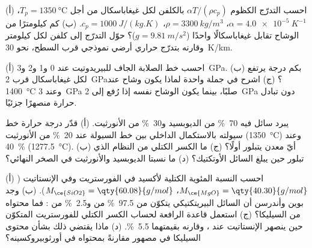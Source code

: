 \begin{exercise}[$\star$]\label{exo:b2:mantle-melting:3}
(أ) احسب التدرّج الكظوم $\alpha T/(\rho c_p)$ بالكلفن لكل غيغاباسكال
من أجل $T_p = \qty{1350}{\celsius}$، $\alpha = \qty{4.0e-5}{K^{-1}}$، $\rho =
\qty{3300}{kg/m^3}$، $c_p = \qty{1000}{J/(kg.K)}$. (ب) كم كيلومترًا من
الوشاح تقابل غيغاباسكالًا واحدًا ($g = \qty{9.81}{m/s^2}$)؟ حوّل التدرّج إلى كلفن
لكل كيلومتر وقارنه بتدرّج حراري أرضي نموذجي قرب السطح،
نحو \qty{30}{K/km}.
\end{exercise}

\begin{exercise}[$\star$]\label{exo:b2:mantle-melting:4}
(أ) احسب خط الصلابة الجاف للبيريدوتيت عند 0 و1 و2 و\qty{3}{GPa}. (ب) بكم
درجة يرتفع لكل غيغاباسكال قرب \qty{2}{GPa}؟ (ج) اشرح في جملة
واحدة لماذا يكون وشاح عند \qty{1400}{\celsius} وعند \qty{3}{GPa} صلبًا، بينما يكون
الوشاح نفسه إذا رُفع إلى \qty{2}{GPa} دون تبادل حرارة منصهرًا جزئيًا.
\end{exercise}

\begin{exercise}[$\star\star$]\label{exo:b2:mantle-melting:5}
يبرد سائل فيه \qty{70}{\percent} من الديوبسيد و\qty{30}{\percent} من الأنورثيت.
(أ) قدّر درجة حرارة خط سيولته بالاستكمال الداخلي بين خط السيولة عند
\qty{20}{\percent} من الأنورثيت (\qty{1350}{\celsius}) وعند \qty{40}{\percent}
(\qty{1277.5}{\celsius}). (ب) أيّ معدن يتبلور أولًا؟ (ج) ما الكسر الكتلي
من النظام الذي تبلور حين يبلغ السائل الأوتكتيك؟
(د) ما نسبتا الديوبسيد والأنورثيت في الصخر النهائي؟
\end{exercise}

\begin{exercise}[$\star\star$]\label{exo:b2:mantle-melting:6}
(أ) احسب النسبة المئوية الكتلية لأكسيد  في الفورستريت  وفي
الإنستاتيت  ($M_{\ce{MgO}} = \qty{40.30}{g/mol}$، $M_{\ce{SiO2}} =
\qty{60.08}{g/mol}$). (ب) وجد بوين وأندرسن أن السائل البيريتكتيكي يتكوّن من
\qty{97.5}{\percent} من  و\qty{2.5}{\percent} من : فما
محتواه من السيليكا؟ (ج) استعمل قاعدة الرافعة لحساب الكسر الكتلي للفورستريت
المتكوّن حين ينصهر الإنستاتيت عند ، وقارنه بقيمتهما
\qty{5.5}{\percent}. (د) ماذا يقتضي ذلك بشأن محتوى السيليكا في مصهور
 مقارنةً بمحتواه في أورثوبيروكسينه؟
\end{exercise}

